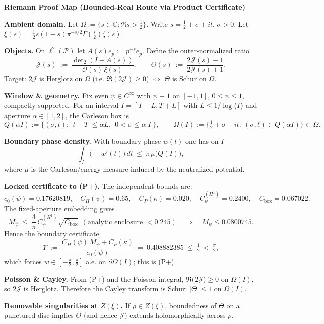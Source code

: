 \documentclass[10pt]{article}
\newcommand{\czero}{0.17620819} %
\newcommand{\CH}{0.65}          %
\newcommand{\CP}{0.020}         %
\newcommand{\CHone}{0.2400}     %
\newcommand{\Cbox}{0.067022}    %
\newcommand{\Mpsilocked}{0.0800745} %
\newcommand{\Ups}{0.408882385}  %
\begin{document}
\textbf{\large Riemann Proof Map (Bounded-Real Route via Product Certificate)}

\textbf{Ambient domain.} Let $\Omega:=\{s\in\mathbb C:\Re s>\tfrac12\}$. Write $s=\tfrac12+\sigma+it$, $\sigma>0$.
Let $\xi(s)=\tfrac12 s(1-s)\pi^{-s/2}\Gamma(\tfrac{s}{2})\zeta(s)$.

\textbf{Objects.} On $\ell^2(\mathcal P)$ let $A(s)e_p:=p^{-s}e_p$. Define the outer-normalized ratio
\[
  \mathcal J(s)\ :=\ \frac{\det\nolimits_2(I-A(s))}{\mathcal O(s)\,\xi(s)},
  \qquad
  \Theta(s)\ :=\ \frac{2\mathcal J(s)-1}{2\mathcal J(s)+1}.
\]
Target: $2\mathcal J$ is Herglotz on $\Omega$ (i.e. $\Re(2\mathcal J)\ge 0$) $\Longleftrightarrow$ $\Theta$ is Schur on $\Omega$.

\textbf{Window \& geometry.} Fix even $\psi\in C^\infty$ with $\psi\equiv1$ on $[-1,1]$, $0\le\psi\le1$, compactly supported.
For an interval $I=[T-L,T+L]$ with $L\le 1/\log\langle T\rangle$ and aperture $\alpha\in[1,2]$, the Carleson box is
\[
  Q(\alpha I):=\{(\sigma,t):\, |t-T|\le \alpha L,\ \ 0<\sigma\le \alpha|I|\},\qquad
  \Omega(I):=\{\tfrac12+\sigma+it:\ (\sigma,t)\in Q(\alpha I)\}\subset\Omega.
\]

\textbf{Boundary phase density.} With boundary phase $w(t)$ one has on $I$
\[
  \int_I \!\big(-w'(t)\big)\,dt \ \le\ \pi\,\mu\!\big(Q(I)\big),
\]
where $\mu$ is the Carleson/energy measure induced by the neutralized potential.

\textbf{Locked certificate to (P+).} The independent bounds are:
\[
  c_0(\psi)=\czero,\quad C_H(\psi)=\CH,\quad C_P(\kappa)=\CP,\quad
  C^{(H^1)}_\psi=\CHone,\quad C_{\mathrm{box}}=\Cbox.
\]
The fixed-aperture embedding gives
\[
  M_\psi\ \le\ \frac{4}{\pi}\,C^{(H^1)}_\psi\sqrt{C_{\mathrm{box}}}\ \ (\text{analytic enclosure }<0.245)
  \quad\Rightarrow\quad M_\psi\le \Mpsilocked.
\]
Hence the boundary certificate
\[
  \Upsilon\ :=\ \frac{C_H(\psi)\,M_\psi + C_P(\kappa)}{c_0(\psi)}\ =\ \Ups\ \le\ \tfrac12\ <\ \tfrac{\pi}{2},
\]
which forces $w\in[-\tfrac{\pi}{2},\tfrac{\pi}{2}]$ a.e. on $\partial\Omega(I)$; this is (P+).

\textbf{Poisson \& Cayley.} From (P+) and the Poisson integral, $\Re\big(2\mathcal J\big)\ge 0$ on $\Omega(I)$, so $2\mathcal J$ is Herglotz.
Therefore the Cayley transform is Schur: $|\Theta|\le1$ on $\Omega(I)$.

\textbf{Removable singularities at $Z(\xi)$.} If $\rho\in Z(\xi)$, boundedness of $\Theta$ on a punctured disc implies $\Theta$ (and hence $\mathcal J$) extends holomorphically across $\rho$.
\end{document}
